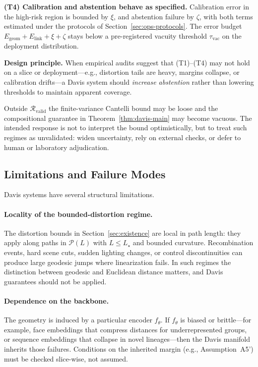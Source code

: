\documentclass[11pt]{article}
\theoremstyle{remark}
\theoremstyle{plain}
\begin{document}
\medskip\noindent
\textbf{(T4) Calibration and abstention behave as specified.} Calibration error in the high-risk
region is bounded by $\xi$, and abstention failure by $\zeta$, with both terms estimated under the
protocols of Section~\ref{sec:ops-protocols}. The error budget
$E_{\mathrm{geom}} + E_{\mathrm{link}} + \xi + \zeta$ stays below a pre-registered vacuity threshold
$\tau_{\mathrm{vac}}$ on the deployment distribution.

\begin{mdframed}
\textbf{Design principle.} When empirical audits suggest that (T1)--(T4) may not hold on a slice or
deployment---e.g., distortion tails are heavy, margins collapse, or calibration drifts---a Davis system
should \emph{increase abstention} rather than lowering thresholds to maintain apparent coverage.
\end{mdframed}

Outside $\mathcal{R}_{\mathrm{valid}}$ the finite-variance Cantelli bound may be loose and the compositional
guarantee in Theorem~\ref{thm:davis-main} may become vacuous. The intended response is not to
interpret the bound optimistically, but to treat such regimes as unvalidated: widen uncertainty,
rely on external checks, or defer to human or laboratory adjudication.

\subsection{Limitations and Failure Modes}

Davis systems have several structural limitations.

\paragraph{Locality of the bounded-distortion regime.}
The distortion bounds in Section~\ref{sec:existence} are local in path length: they apply along
paths in $\mathcal{P}(L)$ with $L \le L_\star$ and bounded curvature. Recombination events, hard
scene cuts, sudden lighting changes, or control discontinuities can produce large geodesic jumps
where linearization fails. In such regimes the distinction between geodesic and Euclidean distance
matters, and Davis guarantees should not be applied.

\paragraph{Dependence on the backbone.}
The geometry is induced by a particular encoder $f_\theta$. If $f_\theta$ is biased or brittle---for
example, face embeddings that compress distances for underrepresented groups, or sequence
embeddings that collapse in novel lineages---then the Davis manifold inherits those failures.
Conditions on the inherited margin (e.g., Assumption~A5') must be checked slice-wise, not assumed.
\end{document}
